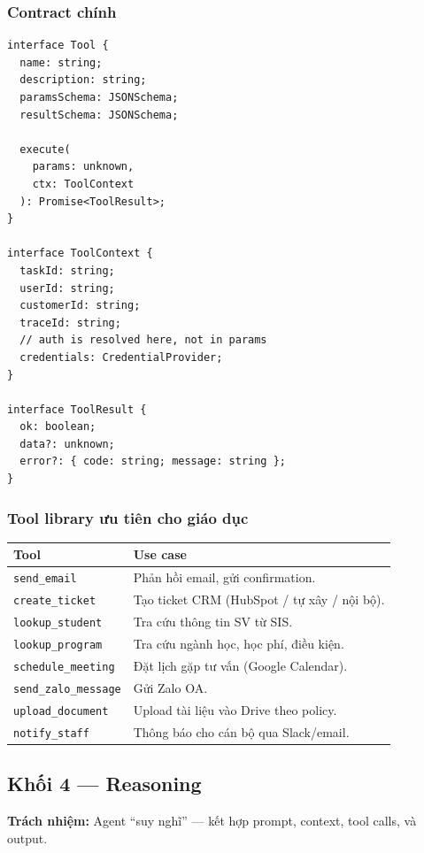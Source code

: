 \documentclass[11pt,a4paper]{article}
\begin{document}
\subsubsection*{Contract chính}

\begin{lstlisting}
interface Tool {
  name: string;
  description: string;
  paramsSchema: JSONSchema;
  resultSchema: JSONSchema;

  execute(
    params: unknown,
    ctx: ToolContext
  ): Promise<ToolResult>;
}

interface ToolContext {
  taskId: string;
  userId: string;
  customerId: string;
  traceId: string;
  // auth is resolved here, not in params
  credentials: CredentialProvider;
}

interface ToolResult {
  ok: boolean;
  data?: unknown;
  error?: { code: string; message: string };
}
\end{lstlisting}

\subsubsection*{Tool library ưu tiên cho giáo dục}

\begin{tabularx}{\linewidth}{@{}p{3cm} X@{}}
\toprule
\textbf{Tool} & \textbf{Use case} \\
\midrule
\texttt{send\_email} & Phản hồi email, gửi confirmation. \\
\texttt{create\_ticket} & Tạo ticket CRM (HubSpot / tự xây / nội bộ). \\
\texttt{lookup\_student} & Tra cứu thông tin SV từ SIS. \\
\texttt{lookup\_program} & Tra cứu ngành học, học phí, điều kiện. \\
\texttt{schedule\_meeting} & Đặt lịch gặp tư vấn (Google Calendar). \\
\texttt{send\_zalo\_message} & Gửi Zalo OA. \\
\texttt{upload\_document} & Upload tài liệu vào Drive theo policy. \\
\texttt{notify\_staff} & Thông báo cho cán bộ qua Slack/email. \\
\bottomrule
\end{tabularx}

\subsection{Khối 4 — Reasoning}

\textbf{Trách nhiệm:} Agent ``suy nghĩ'' --- kết hợp prompt, context, tool calls, và output.
\end{document}
